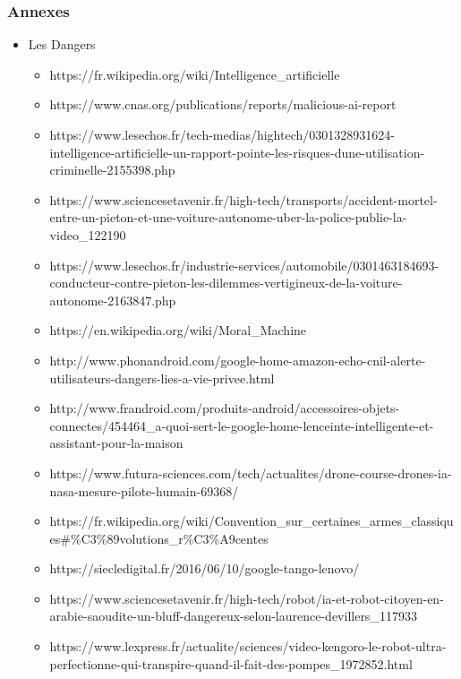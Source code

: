 \documentclass{beamer}
\begin{document}
	\begin{frame}[fragile]
	\frametitle{Annexes}
	\begin{itemize}
	\itemsep1em
		\item Les Dangers
		\begin{itemize}
		\itemsep1em
			\item https://fr.wikipedia.org/wiki/Intelligence\_artificielle
			\item https://www.cnas.org/publications/reports/malicious-ai-report
			\item https://www.lesechos.fr/tech-medias/hightech/0301328931624-intelligence-artificielle-un-rapport-pointe-les-risques-dune-utilisation-criminelle-2155398.php
			\item https://www.sciencesetavenir.fr/high-tech/transports/accident-mortel-entre-un-pieton-et-une-voiture-autonome-uber-la-police-publie-la-video\_122190
			\item https://www.lesechos.fr/industrie-services/automobile/0301463184693-conducteur-contre-pieton-les-dilemmes-vertigineux-de-la-voiture-autonome-2163847.php
			\item https://en.wikipedia.org/wiki/Moral\_Machine
			\item http://www.phonandroid.com/google-home-amazon-echo-cnil-alerte-utilisateurs-dangers-lies-a-vie-privee.html
			\item http://www.frandroid.com/produits-android/accessoires-objets-connectes/454464\_a-quoi-sert-le-google-home-lenceinte-intelligente-et-assistant-pour-la-maison
			\item https://www.futura-sciences.com/tech/actualites/drone-course-drones-ia-nasa-mesure-pilote-humain-69368/
			\item https://fr.wikipedia.org/wiki/Convention\_sur\_certaines\_armes\_classiques\#\%C3\%89volutions\_r\%C3\%A9centes
			\item https://siecledigital.fr/2016/06/10/google-tango-lenovo/
			\item https://www.sciencesetavenir.fr/high-tech/robot/ia-et-robot-citoyen-en-arabie-saoudite-un-bluff-dangereux-selon-laurence-devillers\_117933
			\item https://www.lexpress.fr/actualite/sciences/video-kengoro-le-robot-ultra-perfectionne-qui-transpire-quand-il-fait-des-pompes\_1972852.html
		\end{itemize}
		\end{itemize}
	\end{frame}
	
\end{document}
